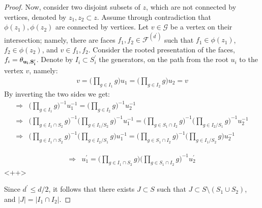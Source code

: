 \begin{proof}
Now, consider two disjoint subsets of $z$, which are not connected by vertices, denoted by $z_{1}, z_{2} \subset z$. Assume through contradiction that $\phi(z_{1}), \phi(z_{2})$ are connected by vertices. Let $v \in \mathcal{G}$ be a vertex on their intersection; namely, there are faces $f_{1}, f_{2} \in \mathcal{F}^{(d^{\prime})}$ such that $f_{1} \in \phi(z_{1})$, $f_{2} \in \phi(z_{2})$, and $v \in f_{1}, f_{2}$. Consider the rooted presentation of the faces, $f_{i} = \mathbf{\theta_{u_{i} ,S^{\prime}_{i}} }$.
Denote by $I_{i} \subset S^{\prime}_{i}$ the generators, on the path from the root $u_{i}$ to the vertex $v$, namely:  
\begin{equation*}
  \begin{split}
    v = \bigl(\prod_{g \in I_{1}} g \bigr) u_{1}  =   \bigl(\prod_{g \in I_{2}} g \bigr) u_{2}  = v
  \end{split}
\end{equation*}
By inverting the two sides we get:  
\begin{equation*}
  \begin{split}
    \Rightarrow & \bigl(\prod_{g \in I_{1}} g \bigr)^{-1} u^{-1}_{1}  =   \bigl(\prod_{g \in I_{2}} g \bigr)^{-1} u^{-1}_{2}  \\
    \Rightarrow & \bigl(\prod_{g \in I_{1}\cap S_{2}} g \bigr)^{-1}\bigl(\prod_{g \in I_{1}/S_{2}} g \bigr)^{-1} u^{-1}_{1}  =   \bigl(\prod_{g \in S_{1} \cap I_{2}} g \bigr)^{-1}\bigl(\prod_{g \in I_{2} / S_{1}} g \bigr)^{-1} u^{-1}_{2}  \\
    \Rightarrow & \bigl(\prod_{g \in I_{1}\cap S_{2}} g \bigr)^{-1}\bigl(\prod_{g \in I_{2}/S_{1}} g \bigr) u^{-1}_{1}  =   \bigl(\prod_{g \in S_{1} \cap I_{2}} g \bigr)^{-1}\bigl(\prod_{g \in I_{1} / S_{2}} g \bigr) u^{-1}_{2}  
  \end{split}
\end{equation*}



\begin{equation*}
  \begin{split}
    \Rightarrow & u^{\prime}_{1}  =  \bigl(\prod_{g \in I_{1}\cap S_{2}} g \bigr) \bigl(\prod_{g \in S_{1} \cap I_{2}} g \bigr)^{-1} u^{\prime}_{2}  
  \end{split}
\end{equation*}<++>

Since $d^{\prime} \le d/2$, it follows that there exists $J \subset S$ such that $J \subset S \setminus (S_{1} \cup S_{2})$, and $|J| = |I_{1} \cap I_{2}|$.



\end{proof}
